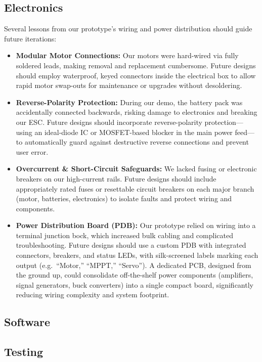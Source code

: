\subsection{Electronics}

Several lessons from our prototype's wiring and power distribution should guide future iterations:
\begin{itemize}
  \item \textbf{Modular Motor Connections:} 
    Our motors were hard-wired via fully soldered leads, making removal and replacement cumbersome. Future designs should employ waterproof, keyed connectors inside the electrical box to allow rapid motor swap-outs for maintenance or upgrades without desoldering.
  \item \textbf{Reverse-Polarity Protection:} 
    During our demo, the battery pack was accidentally connected backwards, risking damage to electronics and breaking our ESC. Future designs should incorporate reverse-polarity protection—using an ideal-diode IC or MOSFET-based blocker in the main power feed—to automatically guard against destructive reverse connections and prevent user error.
  \item \textbf{Overcurrent \& Short-Circuit Safeguards:} 
    We lacked fusing or electronic breakers on our high-current rails. Future designs should include appropriately rated fuses or resettable circuit breakers on each major branch (motor, batteries, electronics) to isolate faults and protect wiring and components.
  \item \textbf{Power Distribution Board (PDB):} 
    Our prototype relied on wiring into a terminal junction bock, which increased bulk cabling and complicated troubleshooting. Future designs should use a custom PDB with integrated connectors, breakers, and status LEDs, with silk-screened labels marking each output (e.g.\ “Motor,” “MPPT,” “Servo”). A dedicated PCB, designed from the ground up, could consolidate off-the-shelf power components (amplifiers, signal generators, buck converters) into a single compact board, significantly reducing wiring complexity and system footprint.
\end{itemize}
    
\subsection{Software}

\subsection{Testing}